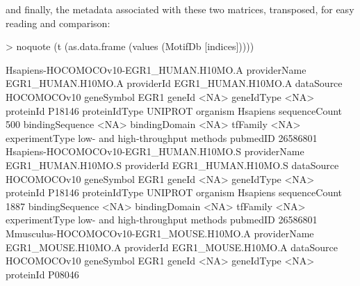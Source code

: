 \documentclass{article}
\renewenvironment{Schunk}{\vspace{\topsep}}{\vspace{\topsep}}
\begin{document}
and finally, the metadata associated with these two matrices, transposed, for easy reading and comparison:
\begin{Schunk}
\begin{Sinput}
> noquote (t (as.data.frame (values (MotifDb [indices]))))
\end{Sinput}
\begin{Soutput}
                Hsapiens-HOCOMOCOv10-EGR1_HUMAN.H10MO.A
providerName    EGR1_HUMAN.H10MO.A                     
providerId      EGR1_HUMAN.H10MO.A                     
dataSource      HOCOMOCOv10                            
geneSymbol      EGR1                                   
geneId          <NA>                                   
geneIdType      <NA>                                   
proteinId       P18146                                 
proteinIdType   UNIPROT                                
organism        Hsapiens                               
sequenceCount   500                                    
bindingSequence <NA>                                   
bindingDomain   <NA>                                   
tfFamily        <NA>                                   
experimentType  low- and high-throughput methods       
pubmedID        26586801                               
                Hsapiens-HOCOMOCOv10-EGR1_HUMAN.H10MO.S
providerName    EGR1_HUMAN.H10MO.S                     
providerId      EGR1_HUMAN.H10MO.S                     
dataSource      HOCOMOCOv10                            
geneSymbol      EGR1                                   
geneId          <NA>                                   
geneIdType      <NA>                                   
proteinId       P18146                                 
proteinIdType   UNIPROT                                
organism        Hsapiens                               
sequenceCount   1887                                   
bindingSequence <NA>                                   
bindingDomain   <NA>                                   
tfFamily        <NA>                                   
experimentType  low- and high-throughput methods       
pubmedID        26586801                               
                Mmusculus-HOCOMOCOv10-EGR1_MOUSE.H10MO.A
providerName    EGR1_MOUSE.H10MO.A                      
providerId      EGR1_MOUSE.H10MO.A                      
dataSource      HOCOMOCOv10                             
geneSymbol      EGR1                                    
geneId          <NA>                                    
geneIdType      <NA>                                    
proteinId       P08046                                  

\end{Soutput}
\end{Schunk}
\end{document}
